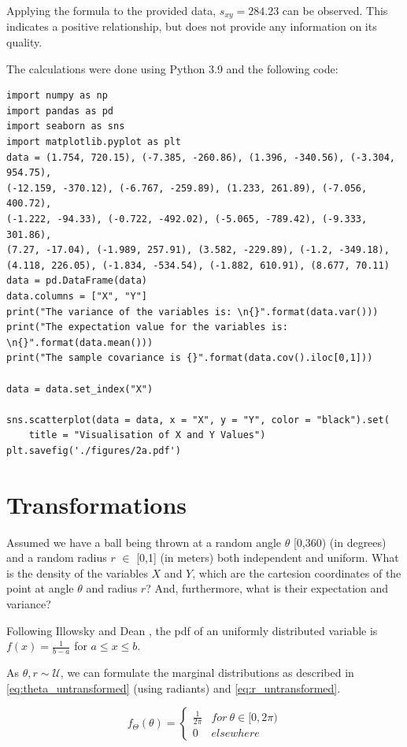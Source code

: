 Applying the formula to the provided data, $s_{xy} = 284.23$ can be observed. This indicates a positive relationship, but does not provide any information on its quality. 

The calculations were done using Python 3.9 and the following code:

\begin{lstlisting}
import numpy as np
import pandas as pd
import seaborn as sns
import matplotlib.pyplot as plt
data = (1.754, 720.15), (-7.385, -260.86), (1.396, -340.56), (-3.304, 954.75),
(-12.159, -370.12), (-6.767, -259.89), (1.233, 261.89), (-7.056, 400.72), 
(-1.222, -94.33), (-0.722, -492.02), (-5.065, -789.42), (-9.333, 301.86),
(7.27, -17.04), (-1.989, 257.91), (3.582, -229.89), (-1.2, -349.18), 
(4.118, 226.05), (-1.834, -534.54), (-1.882, 610.91), (8.677, 70.11)
data = pd.DataFrame(data)
data.columns = ["X", "Y"]
print("The variance of the variables is: \n{}".format(data.var()))
print("The expectation value for the variables is: \n{}".format(data.mean()))
print("The sample covariance is {}".format(data.cov().iloc[0,1]))

data = data.set_index("X")

sns.scatterplot(data = data, x = "X", y = "Y", color = "black").set(
    title = "Visualisation of X and Y Values")
plt.savefig('./figures/2a.pdf')
\end{lstlisting}


\section{Transformations}
Assumed we have a ball being thrown at a random angle $\theta$ [0,360) (in degrees) and a random radius $r$ $\in$ [0,1] (in meters) both independent and uniform. What is the density of the variables $X$ and $Y$, which are the cartesion coordinates of the point at angle $\theta$ and radius $r$? And, furthermore, what is their expectation and variance?

Following Illowsky and Dean \cite[Chapter~5.2]{illowsky2018introductory}, the pdf of an uniformly distributed variable is $f(x) = \frac{1}{b-a}$ for $a \leq x \leq b$. 

As $\theta,r \sim \mathcal{U}$, we can formulate the marginal distributions as described in \ref{eq:theta_untransformed} (using radiants) and \ref{eq:r_untransformed}.

\begin{equation}
f_\Theta(\theta) = 
\begin{cases} 
      \frac{1}{2\pi} & for~\theta \in [0,2\pi)\\
      0&elsewhere
   \end{cases}
\label{eq:theta_untransformed}
\end{equation}

